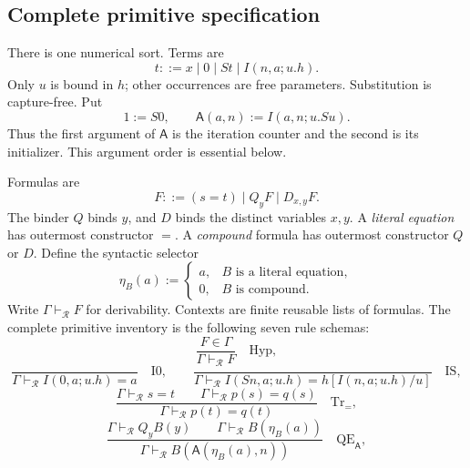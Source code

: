 \documentclass[11pt,a4paper]{article}
\theoremstyle{definition}
\begin{document}
\subsection{Complete primitive specification}
\label{subsec:new-specification}

There is one numerical sort.  Terms are
\[
 t ::= x\mid 0\mid St\mid I(n,a;u.h).
\]
Only $u$ is bound in $h$; other occurrences are free parameters.  Substitution
is capture-free.  Put
\begin{equation}
 1:=S0,\qquad
 \mathsf A(a,n):=I(a,n;u.Su).
 \label{eq:new-add}
\end{equation}
Thus the first argument of $\mathsf A$ is the iteration counter and the
second is its initializer.  This argument order is essential below.

Formulas are
\begin{equation}
 F ::= (s=t)\mid Q_yF\mid D_{x,y}F.
 \label{eq:new-formulas}
\end{equation}
The binder $Q$ binds $y$, and $D$ binds the distinct variables $x,y$.
A \emph{literal equation} has outermost constructor $=$.  A \emph{compound}
formula has outermost constructor $Q$ or $D$.  Define the syntactic selector
\begin{equation}
 \eta_B(a):=
 \begin{cases}
 a,&B\text{ is a literal equation},\\
 0,&B\text{ is compound}.
 \end{cases}
 \label{eq:new-eta}
\end{equation}
Write $\Gamma\vdash_{\mathcal R}F$ for derivability.  Contexts are finite
reusable lists of formulas.  The complete primitive inventory is the following
seven rule schemas:
\[
 \frac{F\in\Gamma}{\Gamma\vdash_{\mathcal R}F}
 \quad\mathrm{Hyp},
\]
\[
 \frac{}{\Gamma\vdash_{\mathcal R}I(0,a;u.h)=a}
 \quad\mathrm{I0},\qquad
 \frac{}{\Gamma\vdash_{\mathcal R}
 I(Sn,a;u.h)=h[I(n,a;u.h)/u]}
 \quad\mathrm{IS},
\]
\begin{equation}
 \frac{\Gamma\vdash_{\mathcal R}s=t\qquad
       \Gamma\vdash_{\mathcal R}p(s)=q(s)}
      {\Gamma\vdash_{\mathcal R}p(t)=q(t)}
 \quad\mathrm{Tr}_{=},
 \label{eq:new-tr}
\end{equation}
\begin{equation}
 \frac{\Gamma\vdash_{\mathcal R}Q_yB(y)\qquad
       \Gamma\vdash_{\mathcal R}B(\eta_B(a))}
      {\Gamma\vdash_{\mathcal R}
         B(\mathsf A(\eta_B(a),n))}
 \quad\mathrm{QE}_{\mathsf A},
 \label{eq:new-qe}
\end{equation}
\end{document}
